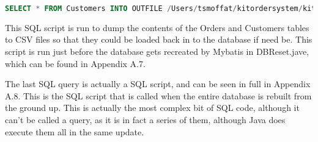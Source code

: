 \documentclass[
11pt, %
a4paper, %
oneside, %
headinclude,footinclude, %
BCOR5mm, %
]{scrartcl}
\begin{document}
\begin{lstlisting}[language=SQL]
	SELECT * FROM Customers INTO OUTFILE /Users/tsmoffat/kitordersystem/kitordersystem/kitordersystem/Customers.csv FIELDS ENCLOSED BY '"' TERMINATED BY ';' ESCAPED BY '"' LINES TERMINATED BY '\r\n'; SELECT * FROM Orders INTO OUTFILE /Users/tsmoffat/kitordersystem/kitordersystem/kitordersystem/Orders.csv FIELDS ENCLOSED BY '"' TERMINATED BY ';' ESCAPED BY '"' LINES TERMINATED BY '\r\n';
\end{lstlisting}
This SQL script is run to dump the contents of the Orders and Customers tables to CSV files so that they could be loaded back in to the database if need be. This script is run just before the database gets recreated by Mybatis in DBReset.jave, which can be found in Appendix A.7.
\par The last SQL query is actually a SQL script, and can be seen in full in Appendix A.8. This is the SQL script that is called when the entire database is rebuilt from the ground up. This is actually the most complex bit of SQL code, although it can't be called a query, as it is in fact a series of them, although Java does execute them all in the same update. 
 
\end{document}
